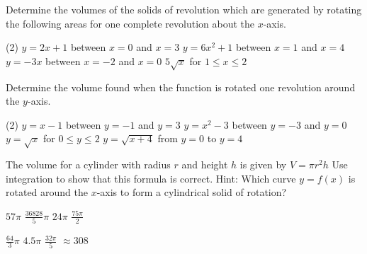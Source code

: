 \begin{Exercise}[title={Volume},label=exVolume]
	\Question Determine the volumes of the solids of revolution which are generated by rotating the following areas for one complete revolution about the $x$-axis.
	\begin{tasks}(2)
		\task  $y=2x+1$ between $x=0$ and $x=3$ %
		\task  $y=6x^2+1$ between $x=1$ and $x=4$ %
		\task $y=-3x$ between $x=-2$ and $x=0$ %
		\task $5\sqrt{x}$ for $1\leq x\leq 2$ %
	\end{tasks}
	
	\Question Determine the volume found when the function is rotated one revolution around the $y$-axis.
	\begin{tasks}(2)
		\task $y=x-1$ between $y=-1$ and $y=3$ %
		\task $y=x^2-3$ between $y=-3$ and $y=0$ %
		\task $y=\sqrt{x}$ for $0\leq y\leq 2$ %
		\task $y=\sqrt{x+4}$ from $y=0$ to $y=4$ %
	\end{tasks}
\Question The volume for a cylinder with radius $r$ and height $h$ is given by $V=\pi r^2h$ Use integration to show that this formula is correct. Hint: Which curve $y=f(x)$ is rotated around the $x$-axis to form a cylindrical solid of rotation?

\end{Exercise}
\begin{Answer}[ref={exVolume}]
		\Question %
	\begin{tasks}
		\task $57\pi$
		\task $\frac{36828}{5}\pi$
		\task $24\pi$
		\task $\frac{75\pi}{2}$
	\end{tasks}
	
	\Question %
	\begin{tasks}
		\task $\frac{64}{3}\pi$
		\task $4.5\pi$
		\task $\frac{32\pi}{5}$
		\task $\approx 308$
	\end{tasks}
\end{Answer}%


